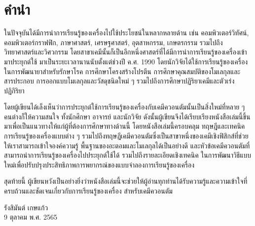 

{

\chapter*{\centering คำนำ}

ในปัจจุบันได้มีการนำการเรียนรู้ของเครื่องไปใช้ประโยชน์ในหลากหลายด้าน เช่น คอมพิวเตอร์วิทัศน์, คอมพิวเตอร์กราฟฟิก, ภาษาศาสตร์, เศรษฐศาสตร์, 
อุตสาหกรรม, เกษตรกรรม รวมไปถึงวิทยาศาสตร์และวิศวกรรม โดยสาขาเคมีนั้นก็เป็นอีกหนึ่งศาสตร์ที่ได้มีการนำการเรียนรู้ของเครื่องเข้ามาประยุกต์ใช้%
มาเป็นระยะเวลานานนับตั้งแต่ช่วงปี ค.ศ. 1990 โดยนักวิจัยได้ใช้การเรียนรู้ของเครื่องในการพัฒนายาสำหรับรักษาโรค การศึกษาโครงสร้างโปรตีน 
การศึกษาคุณสมบัติของโมเลกุลและสารประกอบ การออกแบบโมเลกุลและวัสดุชนิดใหม่ ๆ รวมไปถึงการศึกษาปฏิริยาเคมีและตัวเร่งปฏิกิริยา

โดยผู้เขียนได้เล็งเห็นว่าการประยุกต์ใช้การเรียนรู้ของเครื่องกับเคมีควอนตัมนั้นเป็นสิ่งใหม่ที่หลาย ๆ คนต่างก็ให้ความสนใจ ทั้งนักศึกษา อาจารย์ 
และนักวิจัย ดังนั้นผู้เขียนจึงได้เรียบเรียงหนังสือเล่มนี้ขึ้นมาเพื่อเป็นแนวทางให้แก่ผู้ที่ต้องการศึกษาทางด้านนี้ โดยหนังสือเล่มนี้ครอบคลุม%
ทฤษฎีและเทคนิคการเรียนรู้ของเครื่องแบบต่าง ๆ รวมไปถึงทฤษฎีเคมีควอนตัมซึ่งเป็นสาขาหนึ่งของเคมีเชิงฟิสิกส์ที่ช่วยให้เราสามารถเข้าใจองค์ความรู้%
พื้นฐานของอะตอมและโมเลกุลได้เป็นอย่างดี และหัวข้อเคมีควอนตัมที่สามารถนำการเรียนรู้ของเครื่องไปประยุกต์ใช้ได้ รวมไปถึงรายละเอียดเชิงเทคนิค%
ในการพัฒนาวิธีแบบใหม่เพื่อปรับปรุงประสิทธิภาพการพยากรณ์ของแบบจำลองการเรียนรู้ของเครื่อง

สุดท้ายนี้ ผู้เขียนหวังเป็นอย่างยิ่งว่าหนังสือเล่มนี้จะช่วยให้ผู้อ่านทุกท่านได้รับความรู้และความเข้าใจที่ครบถ้วนและชัดเจนเกี่ยวกับการเรียนรู้ของเครื่อง%
สำหรับเคมีควอนตัม

\medskip

\begin{flushright}
รังสิมันต์ เกษแก้ว \\
9 ตุลาคม พ.ศ. 2565
\end{flushright}
}
